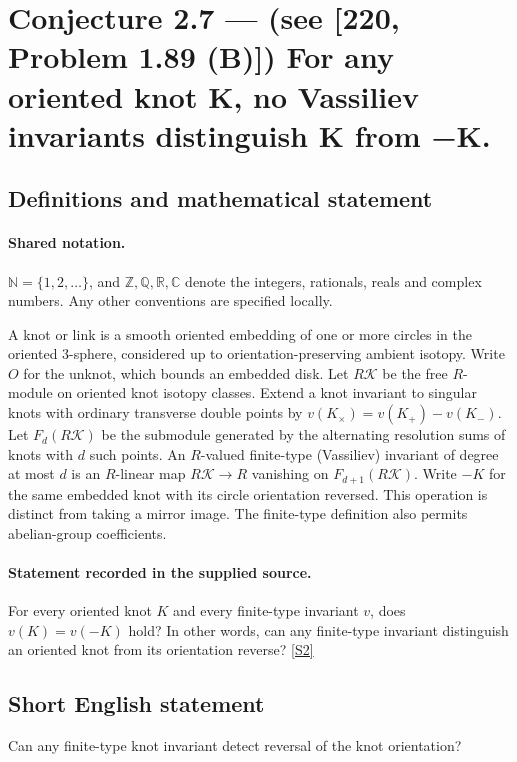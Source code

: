 \documentclass[11pt]{article}
\newcommand{\sref}[2]{\hyperlink{source:#1:#2}{[S#2]}}
\begin{document}
\section{Conjecture 2.7 — (see [220, Problem 1.89 (B)]) For any oriented knot K, no Vassiliev invariants distinguish K from −K.}\label{statement}

\subsection{Definitions and mathematical statement}

\paragraph{Shared notation.}$\mathbb N=\{1,2,\ldots\}$, and $\mathbb Z,\mathbb Q,\mathbb R,\mathbb C$ denote the integers, rationals, reals and complex numbers. Any other conventions are specified locally.


A knot or link is a smooth oriented embedding of one or more circles in the oriented $3$-sphere, considered up to orientation-preserving ambient isotopy. Write $O$ for the unknot, which bounds an embedded disk. Let $R\mathcal K$ be the free $R$-module on oriented knot isotopy classes. Extend a knot invariant to singular knots with ordinary transverse double points by $v(K_\times)=v(K_+)-v(K_-)$. Let $F_d(R\mathcal K)$ be the submodule generated by the alternating resolution sums of knots with $d$ such points. An $R$-valued finite-type (Vassiliev) invariant of degree at most $d$ is an $R$-linear map $R\mathcal K\to R$ vanishing on $F_{d+1}(R\mathcal K)$. Write $-K$ for the same embedded knot with its circle orientation reversed. This operation is distinct from taking a mirror image. The finite-type definition also permits abelian-group coefficients.
\paragraph{Statement recorded in the supplied source.}
For every oriented knot $K$ and every finite-type invariant $v$, does $v(K)=v(-K)$ hold? In other words, can any finite-type invariant distinguish an oriented knot from its orientation reverse? \sref{statement}{2}
\subsection{Short English statement}
Can any finite-type knot invariant detect reversal of the knot orientation?
\end{document}
